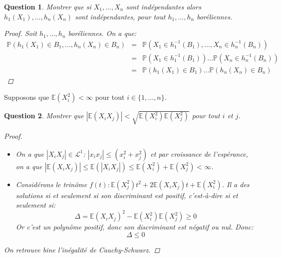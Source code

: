 \documentclass{article}
\theoremstyle{plain}
\newtheorem{question}{Question}
\theoremstyle{definition}
\begin{document}
\begin{question}
	Montrer que si $X_1, \dots, X_n$ sont indépendantes alors $h_1 (X_1), \dots, h_n (X_n)$ sont indépendantes, pour tout $h_1, \dots, h_n$ boréliennes.
	\begin{proof}
		Soit $h_1, \dots, h_n$ boréliennes. On a que:
		\begin{eqnarray*}
			\mathbb{P} (h_1 (X_1) \in B_1, \dots, h_n (X_n) \in B_n) &=& \mathbb{P} (X_1 \in h_1^{-1} (B_1), \dots, X_n \in h_n^{-1} (B_n)) \\
			&=& \mathbb{P} (X_1 \in h_1^{-1} (B_1)) \dots \mathbb{P} (X_n \in h_n^{-1} (B_n)) \\
			&=& \mathbb{P} (h_1 (X_1) \in B_1) \dots \mathbb{P} (h_n (X_n) \in B_n)
		\end{eqnarray*}
	\end{proof}
\end{question}

Supposons que $\mathbb{E} (X_i^2) < \infty$ pour tout $i \in \{1, \dots, n\}$.

\begin{question}
	Montrer que $|\mathbb{E} (X_iX_j)| < \sqrt{\mathbb{E} (X_i^2) \mathbb{E} (X_j^2)}$ pour tout $i$ et $j$.
	\begin{proof}
		\begin{itemize}
			\item On a que $|X_iX_j| \in \mathscr{L}^1$: $|x_ix_j| \leq (x_i^2 + x_j^2)$ et par croissance de l'espérance,
			      on a que $|\mathbb{E} (X_iX_j)| \leq \mathbb{E} (|X_iX_j|) \leq \mathbb{E} (X_i^2) + \mathbb{E} (X_j^2) < \infty$.
			\item Considérons le trinôme $f(t): \mathbb{E}(X_j^2)t^2 + 2\mathbb{E}(X_iX_j)t + \mathbb{E}(X_i^2)$. Il a des solutions
			      si et seulement si son discriminant est positif, c'est-à-dire si et seulement si:
			      \begin{equation*}
				      \Delta = \mathbb{E}(X_iX_j)^2 - \mathbb{E}(X_i^2)\mathbb{E}(X_j^2) \geq 0
			      \end{equation*}
			      Or c'est un polynôme positif, donc son discriminant est négatif ou nul. Donc:
			      \begin{equation*}
				      \Delta \leq 0
			      \end{equation*}
		\end{itemize}

		On retrouve bine l'inégalité de Cauchy-Schwarz.
	\end{proof}
\end{question}
\end{document}
